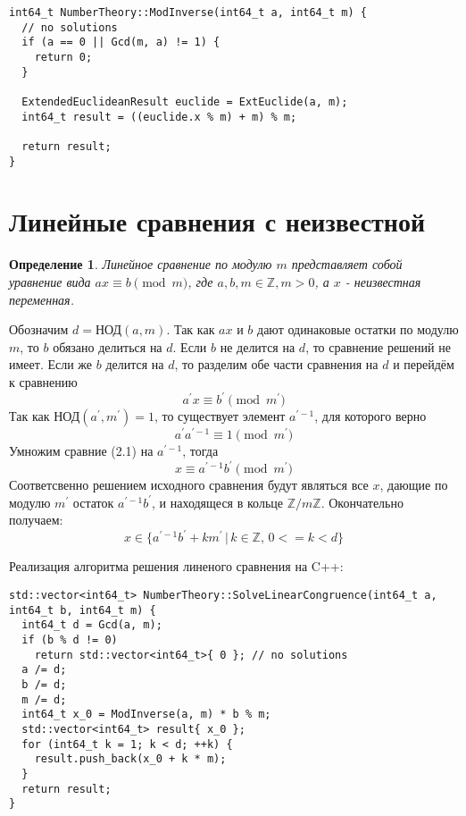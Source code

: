 \documentclass[12pt, a4paper, openany]{book}
\newtheorem*{definition}{Определение}
\begin{document}
\begin{lstlisting}[breaklines=true]
int64_t NumberTheory::ModInverse(int64_t a, int64_t m) {
  // no solutions 
  if (a == 0 || Gcd(m, a) != 1) {
    return 0;
  }

  ExtendedEuclideanResult euclide = ExtEuclide(a, m);
  int64_t result = ((euclide.x % m) + m) % m;

  return result;
}
\end{lstlisting}

\section{Линейные сравнения с неизвестной}

\begin{definition}
Линейное сравнение по модулю $m$ представляет собой уравнение вида $ax \equiv b \pmod{m}$, где $a, b, m \in \mathbb{Z}, m > 0$, а $x$ - неизвестная переменная.
\end{definition}

Обозначим $d = \text{НОД}(a, m)$. Так как $ax$ и $b$ дают одинаковые остатки по модулю $m$, то $b$ обязано делиться на $d$. Если $b$ не делится на $d$, то сравнение решений не имеет.
Если же $b$ делится на $d$, то разделим обе части сравнения на $d$ и перейдём к сравнению 
\begin{equation}a^{'}x \equiv b^{'} \pmod{m^{'}}\end{equation}
Так как $\text{НОД}(a^{'}, m^{'}) = 1$, то существует элемент $a^{'-1}$, для которого верно
\begin{equation}a^{'}a^{'-1} \equiv 1 \pmod{m^{'}}\end{equation}
Умножим сравние (2.1) на $a^{'-1}$, тогда
\begin{equation}x \equiv a^{'-1}b^{'} \pmod{m^{'}}\end{equation}
Соответсвенно решением исходного сравнения будут являться все $x$, дающие по модулю $m^{'}$ остаток $a^{'-1}b^{'}$, и находящеся в кольце $\mathbb{Z}/m\mathbb{Z}$.
Окончательно получаем:
\begin{equation}
x \in \{a^{'-1}b^{'} + km^{'}\, |\, k \in \mathbb{Z},\, 0 <= k < d\}
\end{equation}

\noindent
Реализация алгоритма решения линеного сравнения на C++:

\begin{lstlisting}[breaklines=true]
std::vector<int64_t> NumberTheory::SolveLinearCongruence(int64_t a, int64_t b, int64_t m) {
  int64_t d = Gcd(a, m);
  if (b % d != 0)
    return std::vector<int64_t>{ 0 }; // no solutions
  a /= d;
  b /= d;
  m /= d;
  int64_t x_0 = ModInverse(a, m) * b % m;
  std::vector<int64_t> result{ x_0 };
  for (int64_t k = 1; k < d; ++k) {
    result.push_back(x_0 + k * m);
  }
  return result;
}
\end{lstlisting}
\end{document}
